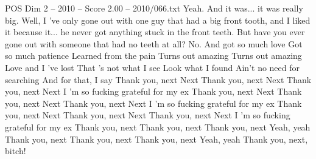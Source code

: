 \begin{textsample}{POS Dim 2 – 2010 – Score 2.00 – 2010/066.txt}
Yeah.
And it was... it was really big.
Well, I 've only gone out with one guy that had a big front tooth, and I liked it because it... he never got anything stuck in the front teeth.
But have you ever gone out with someone that had no teeth at all?
No.
And got so much love Got so much patience Learned from the pain Turns out amazing Turns out amazing Love and I 've lost That 's not what I see Look what I found Ain't no need for searching And for that, I say Thank you, next Next Thank you, next Next Thank you, next Next I 'm so fucking grateful for my ex Thank you, next Next Thank you, next Next Thank you, next Next I 'm so fucking grateful for my ex Thank you, next Next Thank you, next Next Thank you, next Next I 'm so fucking grateful for my ex Thank you, next Thank you, next Thank you, next Yeah, yeah Thank you, next Thank you, next Thank you, next Yeah, yeah Thank you, next, bitch!

\end{textsample}
